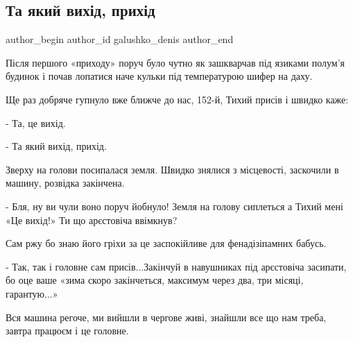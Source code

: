  
 
 
 
 

\subsection{Та який вихід, прихід}
\label{sec:02_12_2022.fb.galushko_denis.1.ta_yakii_vikh_d__pri}

\ifcmt
 author_begin
   author_id galushko_denis
 author_end
\fi

Після першого «приходу» поруч було чутно як зашкварчав під язиками полум'я
будинок і почав лопатися наче кульки під температурою шифер на даху. 

Ще раз добряче гупнуло вже ближче до нас, 152-й, Тихий присів і швидко каже:

- Та, це вихід.

- Та який вихід, прихід. 

Зверху на голови посипалася земля. Швидко знялися з місцевості, заскочили в
машину, розвідка закінчена. 

- Бля, ну ви чули воно поруч йобнуло! Земля на голову сиплеться а Тихий мені
«Це вихід!» Ти що арєстовіча ввімкнув? 

Сам ржу бо знаю його гріхи за це заспокійливе для фенадізіпамних бабусь.

- Так, так і головне сам присів...Закінчуй в навушниках під арєстовіча
засипати, бо оце ваше «зима скоро закінчеться, максимум через два, три місяці,
гарантую...» 

Вся машина регоче, ми вийшли в чергове живі, знайшли все що нам треба, завтра
працюєм і це головне.
